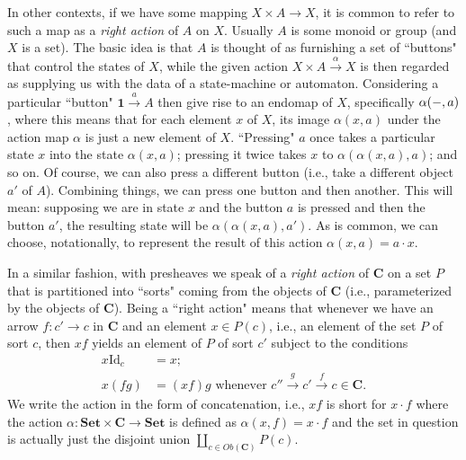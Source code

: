 \documentclass[11pt]{book}
\theoremstyle{definition}
\theoremstyle{definition}
\theoremstyle{definition}
\theoremstyle{theorem}
\theoremstyle{definition}
\begin{document}
In other contexts, if we have some mapping $X \times A \rightarrow X$, it is common to refer to such a map as a \textit{right action} of $A$ on $X$. Usually $A$ is some monoid or group (and $X$ is a set). The basic idea is that $A$ is thought of as furnishing a set of ``buttons" that control the states of $X$, while the given action $X \times A \xrightarrow{\alpha} X$ is then regarded as supplying us with the data of a state-machine or automaton. Considering a particular ``button" $\textbf{1} \xrightarrow{a} A$ then give rise to an endomap of $X$, specifically $\alpha(\--, a)$, where this means that for each element $x$ of $X$, its image $\alpha(x, a)$ under the action map $\alpha$ is just a new element of $X$. ``Pressing" $a$ once takes a particular state $x$ into the state $\alpha(x,a)$; pressing it twice takes $x$ to $\alpha(\alpha(x,a),a)$; and so on. Of course, we can also press a different button (i.e., take a different object $a'$ of $A$). Combining things, we can press one button and then another. This will mean: supposing we are in state $x$ and the button $a$ is pressed and then the button $a'$, the resulting state will be $\alpha(\alpha(x,a), a')$. As is common, we can choose, notationally, to represent the result of this action $\alpha(x,a) = a \cdot x.$ \par    
In a similar fashion, with presheaves we speak of a \textit{right action} of \textbf{C} on a set $P$ that is partitioned into ``sorts" coming from the objects of \textbf{C} (i.e., parameterized by the objects of \textbf{C}). Being a ``right action" means that whenever we have an arrow $f: c' \rightarrow c$ in \textbf{C} and an element $x \in P(c)$, i.e., an element of the set $P$ of sort $c$, then $xf$ yields an element of $P$ of sort $c'$ subject to the conditions 
\begin{equation*}
\begin{split}
x \text{Id}_c & = x ; \\ 
x(fg) & = (xf)g \text{ whenever } c'' \xrightarrow{g} c' \xrightarrow{f} c \in \textbf{C}. 
\end{split}
\end{equation*}
We write the action in the form of concatenation, i.e., $xf$ is short for $x \cdot f$ where the action $\alpha: \textbf{Set} \times \textbf{C} \rightarrow \textbf{Set}$ is defined as $\alpha(x,f) = x \cdot f$ and the set in question is actually just the disjoint union $\amalg_{c \in Ob(\textbf{C})} P(c)$. \par 
\end{document}

